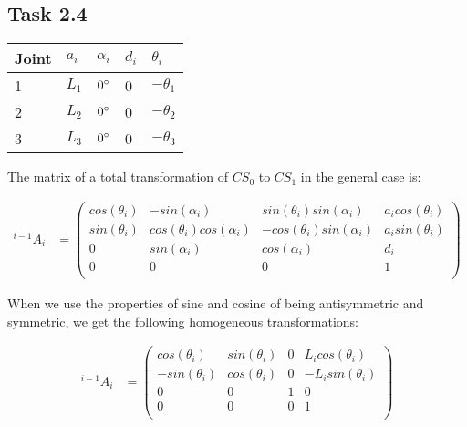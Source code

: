 \subsection*{Task 2.4}
\begin{center}
	\begin{tabular}{ | l | l | l | l | l |}
		\hline
		Joint & $a_{i}$ & $\alpha_{i}$ & $d_i$ & $\theta_i$ \\ \hline
		1 & $L_1$ & $0\degree$ & 0 & $-\theta_1$\\ \hline
		2 & $L_2$ & $0\degree$ & 0 & $-\theta_2$\\ \hline
		3 & $L_3$ & $0\degree$ & 0 & $-\theta_3$\\ \hline
	\end{tabular}
\end{center}

The matrix of a total transformation of $CS_0$ to $CS_1$ in the general case is:

\begin{align*}
^{i-1}A_i &= 
\begin{pmatrix}
cos(\theta_i) & -sin(\alpha_i) & sin(\theta_i)sin(\alpha_i) & a_icos(\theta_i) \\
sin(\theta_i) & cos(\theta_i)cos(\alpha_i) & -cos(\theta_i)sin(\alpha_i) & a_isin(\theta_i) \\
0 & sin(\alpha_i) & cos(\alpha_i) & d_i \\
0 & 0 & 0 & 1 \\
\end{pmatrix}
\end{align*}

When we use the properties of sine and cosine of being antisymmetric and symmetric, we get the following homogeneous transformations:

\begin{align*}
^{i-1}A_i &= 
\begin{pmatrix}
cos(\theta_i) & sin(\theta_i) & 0 & L_icos(\theta_i) \\
-sin(\theta_i) & cos(\theta_i) & 0 & -L_isin(\theta_i) \\
0 & 0 & 1 & 0 \\
0 & 0 & 0 & 1 \\
\end{pmatrix}
\end{align*}
